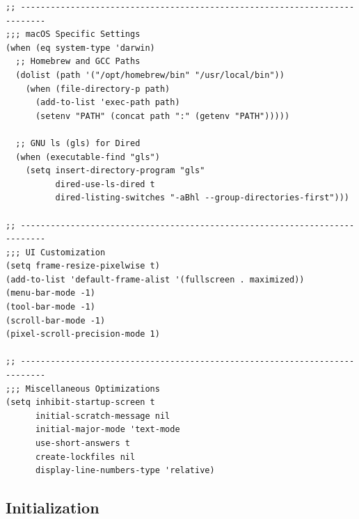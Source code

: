 \documentclass[11pt]{article}
\begin{document}
\begin{verbatim}
;; ---------------------------------------------------------------------------
;;; macOS Specific Settings
(when (eq system-type 'darwin)
  ;; Homebrew and GCC Paths
  (dolist (path '("/opt/homebrew/bin" "/usr/local/bin"))
    (when (file-directory-p path)
      (add-to-list 'exec-path path)
      (setenv "PATH" (concat path ":" (getenv "PATH")))))

  ;; GNU ls (gls) for Dired
  (when (executable-find "gls")
    (setq insert-directory-program "gls"
          dired-use-ls-dired t
          dired-listing-switches "-aBhl --group-directories-first")))

;; ---------------------------------------------------------------------------
;;; UI Customization
(setq frame-resize-pixelwise t)
(add-to-list 'default-frame-alist '(fullscreen . maximized))
(menu-bar-mode -1)
(tool-bar-mode -1)
(scroll-bar-mode -1)
(pixel-scroll-precision-mode 1)

;; ---------------------------------------------------------------------------
;;; Miscellaneous Optimizations
(setq inhibit-startup-screen t
      initial-scratch-message nil
      initial-major-mode 'text-mode
      use-short-answers t
      create-lockfiles nil
      display-line-numbers-type 'relative)

\end{verbatim}
\subsection{Initialization}
\label{sec:orge374dc2}
\end{document}
